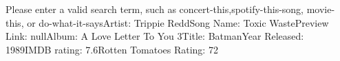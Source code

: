 Please enter a valid search term, such as {concert-this},{spotify-this-song}, {movie-this}, or {do-what-it-says}Artist: Trippie ReddSong Name: Toxic WastePreview Link: nullAlbum: A Love Letter To You 3Title: BatmanYear Released: 1989IMDB rating: 7.6Rotten Tomatoes Rating: 72%
